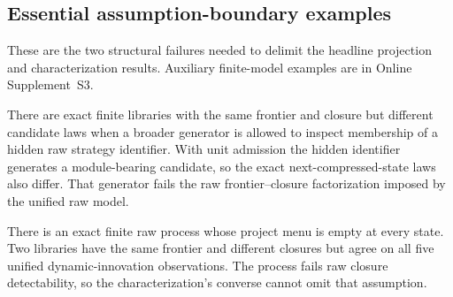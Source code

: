 \subsection{Essential assumption-boundary examples}
\label{app:structural-counterexamples}

These are the two structural failures needed to delimit the headline
projection and characterization results.  Auxiliary finite-model examples
are in Online Supplement~S3.

\begin{counterexample}
\label{cx:raw-identifier-generator}
There are exact finite libraries with the same frontier and closure but
different candidate laws when a broader generator is allowed to inspect
membership of a hidden raw strategy identifier.  With unit admission the
hidden identifier generates a module-bearing candidate, so the exact
next-compressed-state laws also differ.  That generator fails the raw
frontier--closure factorization imposed by the unified raw model.
\end{counterexample}

\begin{counterexample}
\label{cx:raw-closure-invisible}
There is an exact finite raw process whose project menu is empty at every
state.  Two libraries have the same frontier and different closures but agree
on all five unified dynamic-innovation observations.  The process fails raw
closure detectability, so the characterization's converse cannot omit that
assumption.
\end{counterexample}
